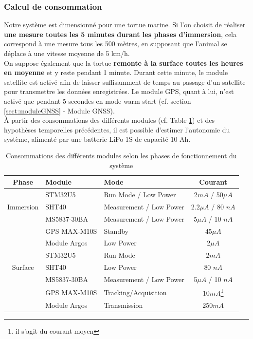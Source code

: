 \documentclass[12pt]{article}
\begin{document}
\subsubsection{Calcul de consommation}

Notre système est dimensionné pour une tortue marine. Si l’on choisit de réaliser \textbf{une mesure toutes les 5 minutes durant les phases d’immersion}, cela correspond à une mesure tous les 500 mètres, en supposant que l’animal se déplace à une vitesse moyenne de 5 km/h. \\
On suppose également que la tortue \textbf{remonte à la surface toutes les heures en moyenne} et y reste pendant 1 minute. Durant cette minute, le module satellite est activé afin de laisser suffisamment de temps au passage d’un satellite pour transmettre les données enregistrées. Le module GPS, quant à lui, n’est activé que pendant 5 secondes en mode warm start (cf. section \ref{sect:moduleGNSS} - Module GNSS). \\

\noindent À partir des consommations des différents modules (cf. Table \ref{tab:conso_phases}) et des hypothèses temporelles précédentes, il est possible d’estimer l’autonomie du système, alimenté par une batterie LiPo 1S de capacité 10 Ah.
\begin{table}[h]
\centering
\caption{Consommations des différents modules selon les phases de fonctionnement du système}
\begin{tabular}{|c|l|l|c|}
\hline
\textbf{Phase} & \textbf{Module} & \textbf{Mode} & \textbf{Courant} \\
\hline\hline

\multirow{3}{*}{Immersion}
& STM32U5 & Run Mode / Low Power & 2$mA$ / 50$\mu A$ \\
& SHT40 & Measurement / Low Power & 2.2$\mu A$ / 80 $nA$ \\
& MS5837-30BA & Measurement / Low Power & 5$\mu A$ / 10 $nA$ \\
& GPS MAX-M10S & Standby & 45$\mu A$ \\
& Module Argos & Low Power & 2$\mu A$ \\
\hline

\multirow{3}{*}{Surface}
& STM32U5 & Run Mode & $2mA$ \\
& SHT40 & Low Power & 80 $nA$ \\
& MS5837-30BA & Measurement / Low Power & 5$\mu A$ / 10 $nA$ \\
& GPS MAX-M10S & Tracking/Acquisition & $10mA$\footnote{il s'agit du courant moyen} \\
& Module Argos & Transmission & $250mA$ \\
\hline

\end{tabular}
\label{tab:conso_phases}
\end{table}
\end{document}
